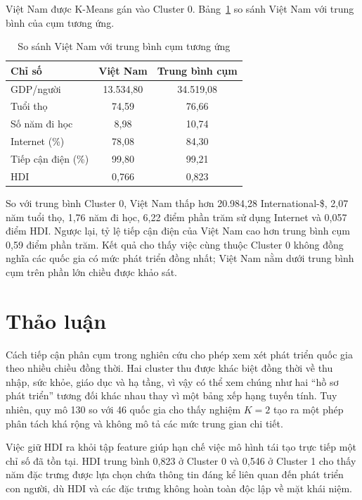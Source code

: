 \documentclass[11pt,a4paper]{article}
\begin{document}
Việt Nam được K-Means gán vào Cluster 0. Bảng~\ref{tab:vietnam} so sánh Việt Nam với trung bình của cụm tương ứng.

\begin{table}[H]
\centering
\caption{So sánh Việt Nam với trung bình cụm tương ứng}
\label{tab:vietnam}
\begin{tabular}{lcc}
\toprule
\textbf{Chỉ số} & \textbf{Việt Nam} & \textbf{Trung bình cụm} \\
\midrule
GDP/người & 13.534,80 & 34.519,08 \\
Tuổi thọ & 74,59 & 76,66 \\
Số năm đi học & 8,98 & 10,74 \\
Internet (\%) & 78,08 & 84,30 \\
Tiếp cận điện (\%) & 99,80 & 99,21 \\
HDI & 0,766 & 0,823 \\
\bottomrule
\end{tabular}
\end{table}

So với trung bình Cluster 0, Việt Nam thấp hơn 20.984,28 International-\$, 2,07 năm tuổi thọ, 1,76 năm đi học, 6,22 điểm phần trăm sử dụng Internet và 0,057 điểm HDI. Ngược lại, tỷ lệ tiếp cận điện của Việt Nam cao hơn trung bình cụm 0,59 điểm phần trăm. Kết quả cho thấy việc cùng thuộc Cluster 0 không đồng nghĩa các quốc gia có mức phát triển đồng nhất; Việt Nam nằm dưới trung bình cụm trên phần lớn chiều được khảo sát.

\section{Thảo luận}

Cách tiếp cận phân cụm trong nghiên cứu cho phép xem xét phát triển quốc gia theo nhiều chiều đồng thời. Hai cluster thu được khác biệt đồng thời về thu nhập, sức khỏe, giáo dục và hạ tầng, vì vậy có thể xem chúng như hai ``hồ sơ phát triển'' tương đối khác nhau thay vì một bảng xếp hạng tuyến tính. Tuy nhiên, quy mô 130 so với 46 quốc gia cho thấy nghiệm $K=2$ tạo ra một phép phân tách khá rộng và không mô tả các mức trung gian chi tiết.

Việc giữ HDI ra khỏi tập feature giúp hạn chế việc mô hình tái tạo trực tiếp một chỉ số đã tồn tại. HDI trung bình 0,823 ở Cluster 0 và 0,546 ở Cluster 1 cho thấy năm đặc trưng được lựa chọn chứa thông tin đáng kể liên quan đến phát triển con người, dù HDI và các đặc trưng không hoàn toàn độc lập về mặt khái niệm.
\end{document}
